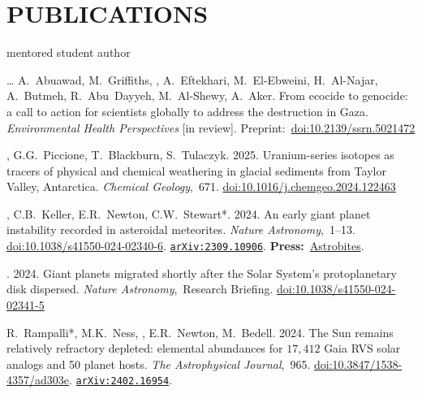 \section{PUBLICATIONS}
\hfill* mentored student author
\newcommand{\inprep}[1]{\textit{#1} [in prep.]}
\newcommand{\submitted}[1]{\textit{#1} [submitted]}
\newcommand{\inreview}[1]{\textit{#1} [in review]}
\newcommand{\inpress}[1]{\textit{#1} [in press]}
\newcommand{\doi}[1]{\href{https://doi.org/#1}{doi:#1}}
\newcommand{\arxiv}[1]{\href{https://arxiv.org/abs/#1}{\texttt{arXiv:#1}}}
\newcommand{\press}[2]{\textbf{Press:}~\href{#1}{#2}}
\newcommand{\pub}[2]{\textit{#1},~#2}

\begin{etaremune} [itemsep=4pt, leftmargin=3ex]
    \item[\dots] A.~Abuawad, M.~Griffiths, \ghedwards, A.~Eftekhari, M.~El-Ebweini, H.~Al-Najar, A.~Butmeh, R.~Abu~Dayyeh, M.~Al-Shewy, A.~Aker. From ecocide to genocide: a call to action for scientists globally to address the destruction in Gaza. \inreview{Environmental Health Perspectives}. Preprint:~\doi{10.2139/ssrn.5021472}
 
    \item \ghedwards, G.G.~Piccione, T.~Blackburn,  S.~Tulaczyk. 2025. Uranium-series isotopes as tracers of physical and chemical weathering in glacial sediments from Taylor Valley, Antarctica. \pub{Chemical Geology}{671}. \doi{10.1016/j.chemgeo.2024.122463}
        
    \item \ghedwards, C.B.~Keller, E.R.~Newton, C.W.~Stewart*. 2024. An early giant planet instability recorded in asteroidal meteorites. \pub{Nature Astronomy}{1--13}. \doi{10.1038/s41550-024-02340-6}. \arxiv{2309.10906}. \press{https://astrobites.org/2023/09/25/meteorites-planet-migration/}{Astrobites}.
    
    \item \ghedwards. 2024. Giant planets migrated shortly after the Solar System’s protoplanetary disk dispersed. \pub{Nature Astronomy} Research Briefing. \doi{10.1038/s41550-024-02341-5}
    
    \item R.~Rampalli*, M.K.~Ness, \ghedwards, E.R.~Newton, M.~Bedell. 2024. The Sun remains relatively refractory depleted: elemental abundances for $17,412$ Gaia RVS solar analogs and 50 planet hosts. \pub{The Astrophysical Journal}{965}. \doi{10.3847/1538-4357/ad303e}. \arxiv{2402.16954}.
    

\end{etaremune}
